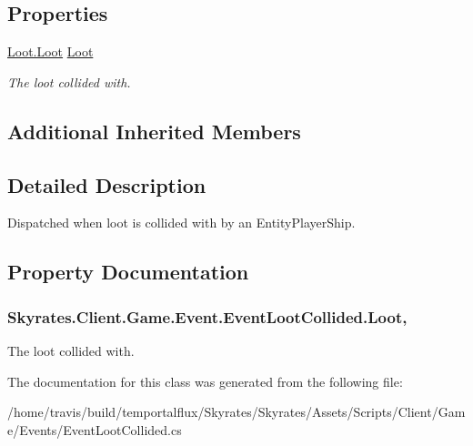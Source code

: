 \subsection*{Properties}
\begin{DoxyCompactItemize}
\item 
\hyperlink{class_skyrates_1_1_client_1_1_loot_1_1_loot}{Loot.\-Loot} \hyperlink{class_skyrates_1_1_client_1_1_game_1_1_event_1_1_event_loot_collided_abdc1910bc5fdaf8424449091fe082b9c}{Loot}
\begin{DoxyCompactList}\small\item\em The loot collided with. \end{DoxyCompactList}\end{DoxyCompactItemize}
\subsection*{Additional Inherited Members}


\subsection{Detailed Description}
Dispatched when loot is collided with by an Entity\-Player\-Ship. 



\subsection{Property Documentation}
\hypertarget{class_skyrates_1_1_client_1_1_game_1_1_event_1_1_event_loot_collided_abdc1910bc5fdaf8424449091fe082b9c}{
\subsubsection[{Loot}]{ Skyrates.\-Client.\-Game.\-Event.\-Event\-Loot\-Collided.\-Loot\hspace{0.3cm}{\ttfamily [get]}, {\ttfamily [set]}}}\label{class_skyrates_1_1_client_1_1_game_1_1_event_1_1_event_loot_collided_abdc1910bc5fdaf8424449091fe082b9c}


The loot collided with. 



The documentation for this class was generated from the following file\-:\begin{DoxyCompactItemize}
\item 
/home/travis/build/temportalflux/\-Skyrates/\-Skyrates/\-Assets/\-Scripts/\-Client/\-Game/\-Events/Event\-Loot\-Collided.\-cs\end{DoxyCompactItemize}
